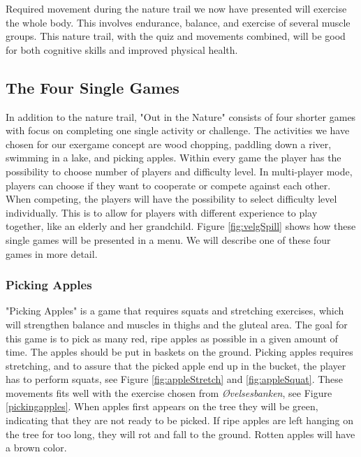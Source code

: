 Required movement during the nature trail we now have presented will exercise the whole body. This involves endurance, balance, and exercise of several muscle groups. This nature trail, with the quiz and movements combined, will be good for both cognitive skills and improved physical health.     


\subsection{The Four Single Games}
In addition to the nature trail, "Out in the Nature" consists of four shorter games with focus on completing one single activity or challenge. The activities we have chosen for our exergame concept are wood chopping, paddling down a river, swimming in a lake, and picking apples. Within every game the player has the possibility to choose number of players and difficulty level. In multi-player mode, players can choose if they want to cooperate or compete against each other. When competing, the players will have the possibility to select difficulty level individually. This is to allow for players with different experience to play together, like an elderly and her grandchild. Figure \ref{fig:velgSpill} shows how these single games will be presented in a menu. We will describe one of these four games in more detail.

\subsubsection{Picking Apples}
"Picking Apples" is a game that requires squats and stretching exercises, which will strengthen balance and muscles in thighs and the gluteal area. The goal for this game is to pick as many red, ripe apples as possible in a given amount of time. The apples should be put in baskets on the ground. Picking apples requires stretching, and to assure that the picked apple end up in the bucket, the player has to perform squats, see Figure \ref{fig:appleStretch} and \ref{fig:appleSquat}. These movements fits well with the exercise chosen from \emph{Øvelsesbanken}, see Figure \ref{pickingapples}. When apples first appears on the tree they will be green, indicating that they are not ready to be picked. If ripe apples are left hanging on the tree for too long, they will rot and fall to the ground. Rotten apples will have a brown color. 

